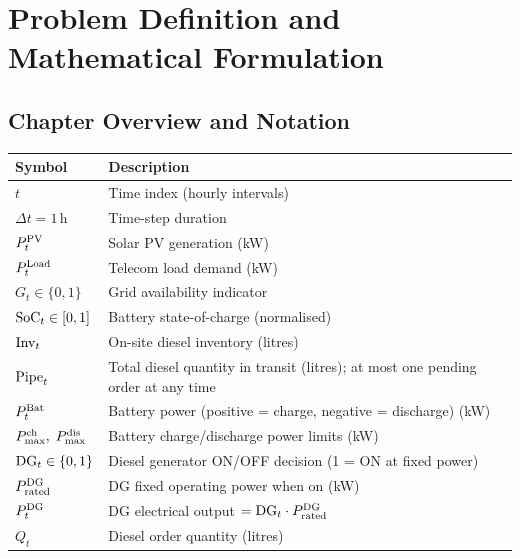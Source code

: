 \chapter{Problem Definition and Mathematical Formulation}
\label{chap:problem}

\section{Chapter Overview and Notation}
\begin{table}[ht]
\centering
\small
\begin{tabular}{l>{\raggedright\arraybackslash}p{9.8cm}}
\toprule
\textbf{Symbol}                        & \textbf{Description} \\
\midrule
$t$                                    & Time index (hourly intervals) \\
$\Delta t = 1$\,h                      & Time-step duration \\
$P_t^{\mathrm{PV}}$                            & Solar PV generation (kW) \\
$P_t^{\mathrm{Load}}$                          & Telecom load demand (kW) \\
$G_t \in \{0,1\}$                      & Grid availability indicator \\
$\mathrm{SoC}_t \in [0,1]$                     & Battery state-of-charge (normalised) \\
$\mathrm{Inv}_t$                               & On-site diesel inventory (litres) \\
$\mathrm{Pipe}_t$                              & Total diesel quantity in transit (litres); at most one
                                         pending order at any time \\
$P_t^{\mathrm{Bat}}$                           & Battery power (positive = charge, negative = discharge) (kW) \\
$P_{\max}^{\mathrm{ch}},\; P_{\max}^{\mathrm{dis}}$    & Battery charge/discharge power limits (kW) \\
$\mathrm{DG}_t \in \{0,1\}$                    & Diesel generator ON/OFF decision (1 = ON at fixed power) \\
$P_{\mathrm{rated}}^{\mathrm{DG}}$             & DG fixed operating power when on (kW) \\
$P_t^{\mathrm{DG}}$                            & DG electrical output $= \mathrm{DG}_t \cdot P_{\mathrm{rated}}^{\mathrm{DG}}$ \\
$Q_t$                                  & Diesel order quantity (litres) \\

\end{tabular}
\end{table}
